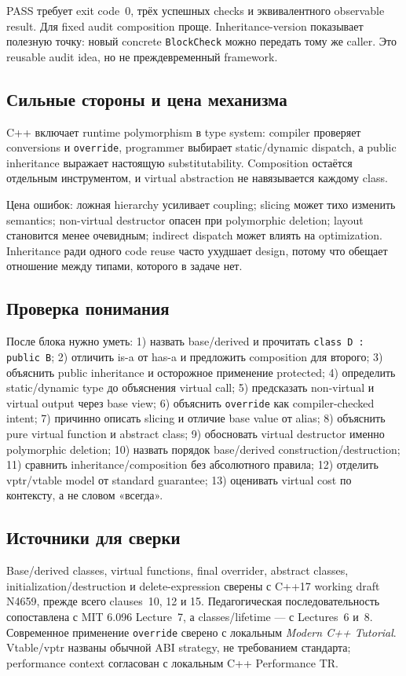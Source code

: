 PASS требует exit code~0, трёх успешных checks и эквивалентного observable
result. Для fixed audit composition проще. Inheritance-version показывает
полезную точку: новый concrete \texttt{BlockCheck} можно передать тому же
caller. Это reusable audit idea, но не преждевременный framework.

\subsection{Сильные стороны и цена механизма}

C++ включает runtime polymorphism в type system: compiler проверяет
conversions и \texttt{override}, programmer выбирает static/dynamic dispatch,
а public inheritance выражает настоящую substitutability. Composition остаётся
отдельным инструментом, и virtual abstraction не навязывается каждому class.

Цена ошибок: ложная hierarchy усиливает coupling; slicing может тихо изменить
semantics; non-virtual destructor опасен при polymorphic deletion; layout
становится менее очевидным; indirect dispatch может влиять на optimization.
Inheritance ради одного code reuse часто ухудшает design, потому что обещает
отношение между типами, которого в задаче нет.

\subsection{Проверка понимания}

После блока нужно уметь:
1) назвать base/derived и прочитать \texttt{class D : public B}; 2) отличить is-a от has-a и предложить composition для второго; 3) объяснить public inheritance и осторожное применение protected; 4) определить static/dynamic type до объяснения virtual call; 5) предсказать non-virtual и virtual output через base view; 6) объяснить \texttt{override} как compiler-checked intent; 7) причинно описать slicing и отличие base value от alias; 8) объяснить pure virtual function и abstract class; 9) обосновать virtual destructor именно polymorphic deletion; 10) назвать порядок base/derived construction/destruction; 11) сравнить inheritance/composition без абсолютного правила; 12) отделить vptr/vtable model от standard guarantee; 13) оценивать virtual cost по контексту, а не словом «всегда».

\subsection{Источники для сверки}

Base/derived classes, virtual functions, final overrider, abstract classes,
initialization/destruction и delete-expression сверены с C++17 working draft
N4659, прежде всего clauses~10, 12 и 15. Педагогическая последовательность
сопоставлена с MIT 6.096 Lecture~7, а classes/lifetime --- с Lectures~6 и~8.
Современное применение \texttt{override} сверено с локальным \textit{Modern
C++ Tutorial}. Vtable/vptr названы обычной ABI strategy, не требованием
стандарта; performance context согласован с локальным C++ Performance TR.
